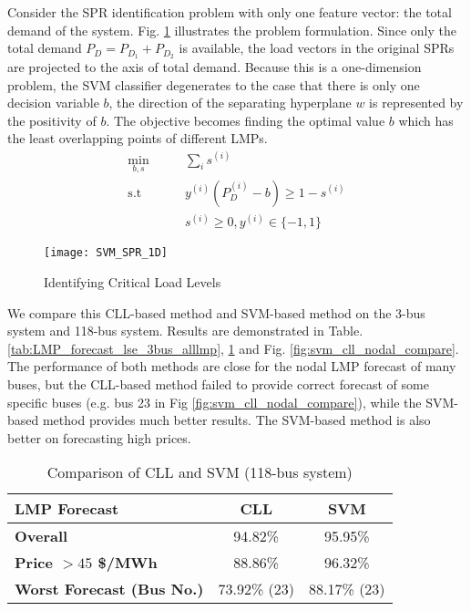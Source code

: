 \documentclass[letterpaper, 11pt]{article}
\theoremstyle{plain}
\theoremstyle{definition}
\begin{document}
Consider the SPR identification problem with only one feature vector: the total demand of the system. 
Fig. \ref{fig:cll_ID} illustrates the problem formulation. Since only the total demand $P_D = P_{D_1} + P_{D_2}$ is available, the load vectors in the original SPRs are projected to the axis of total demand. Because this is a one-dimension problem, the SVM classifier degenerates to the case that there is only one decision variable $b$, the direction of the separating hyperplane $w$ is represented by the positivity of $b$. The objective becomes finding the optimal value $b$ which has the least overlapping points of different LMPs.
\begin{subequations}
\begin{align}
  \min_{b,s} & \qquad { \sum_i s^{(i)} } \label{eqn:SVM2CLL_obj} \\ 
  \text{s.t} & \qquad y^{(i)}( P_D^{(i)} -b) \ge 1-s^{(i)} \label{eqn:SVM2CLL_cons} \\
  & \qquad  s^{(i)} \ge 0, y^{(i)} \in \{-1,1\} \nonumber 
\end{align}
\end{subequations}

\begin{figure}[htbp]
  \centering
  \texttt{[image: SVM\_SPR\_1D]}
  \caption{Identifying Critical Load Levels}
  \label{fig:cll_ID}
\end{figure}

We compare this CLL-based method and SVM-based method on the 3-bus system and 118-bus system. Results are demonstrated in Table. \ref{tab:LMP_forecast_lse_3bus_alllmp}, \ref{tab:cll_svm_118bus} and Fig. \ref{fig:svm_cll_nodal_compare}. The performance of both methods are close for the nodal LMP forecast of many buses, 
but the CLL-based method failed to provide correct forecast of some specific buses (e.g. bus 23 in Fig \ref{fig:svm_cll_nodal_compare}), while the SVM-based method provides much better results. The SVM-based method is also better on forecasting high prices.

\begin{table}[htbp]
  \caption{Comparison of CLL and SVM (118-bus system)}
  \label{tab:cll_svm_118bus}
  \centering

  \begin{tabular}{l|cc}
  \hline

  \hline
  \textbf{LMP Forecast} & CLL & SVM  \\ 
  \hline
  \textbf{Overall} & 94.82\% & 95.95\%\\
  \textbf{Price $> 45$ \$/MWh} & 88.86\%  & 96.32\%\\
  \textbf{Worst Forecast (Bus No.)} & 73.92\% (23) & 88.17\% (23)\\
  \hline

  \hline
  \end{tabular}
\end{table}
\end{document}
